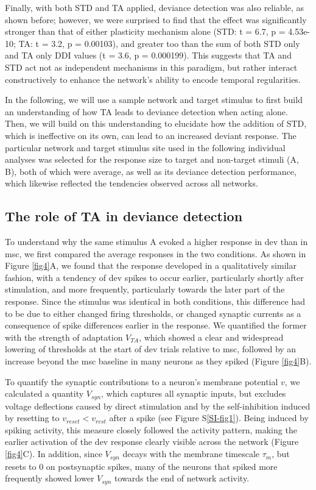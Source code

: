 \documentclass[pdflatex,iicol,sn-basic]{sn-jnl}
\theoremstyle{thmstyleone}%
\theoremstyle{thmstyletwo}%
\theoremstyle{thmstylethree}%
\begin{document}
Finally, with both STD and TA applied, deviance detection was also reliable, as shown before; however, we were surprised to find that the effect was significantly stronger than that of either plasticity mechanism alone (STD: t = 6.7, p = 4.53e-10; TA: t = 3.2, p = 0.00103), and greater too than the sum of both STD only and TA only DDI values (t = 3.6, p = 0.000199). This suggests that TA and STD act not as independent mechanisms in this paradigm, but rather interact constructively to enhance the network's ability to encode temporal regularities.

In the following, we will use a sample network and target stimulus to first build an understanding of how TA leads to deviance detection when acting alone. Then, we will build on this understanding to elucidate how the addition of STD, which is ineffective on its own, can lead to an increased deviant response. The particular network and target stimulus site used in the following individual analyses was selected for the response size to target and non-target stimuli (A, B), both of which were average, as well as its deviance detection performance, which likewise reflected the tendencies observed across all networks.

\subsection{The role of TA in deviance detection}\label{sec-ta}

To understand why the same stimulus A evoked a higher response in dev than in msc, we first compared the average responses in the two conditions. As shown in Figure \ref{fig4}A, we found that the response developed in a qualitatively similar fashion, with a tendency of dev spikes to occur earlier, particularly shortly after stimulation, and more frequently, particularly towards the later part of the response. Since the stimulus was identical in both conditions, this difference had to be due to either changed firing thresholds, or changed synaptic currents as a consequence of spike differences earlier in the response. We quantified the former with the strength of adaptation $V_{TA}$, which showed a clear and widespread lowering of thresholds at the start of dev trials relative to msc, followed by an increase beyond the msc baseline in many neurons as they spiked (Figure \ref{fig4}B).

To quantify the synaptic contributions to a neuron's membrane potential $v$, we calculated a quantity $V_{syn}$, which captures all synaptic inputs, but excludes voltage deflections caused by direct stimulation and by the self-inhibition induced by resetting to $v_{reset} < v_{rest}$ after a spike (see Figure S\ref{SI-fig1}). Being induced by spiking activity, this measure closely followed the activity pattern, making the earlier activation of the dev response clearly visible across the network (Figure \ref{fig4}C). In addition, since $V_{syn}$ decays with the membrane timescale $\tau_m$, but resets to $0$ on postsynaptic spikes, many of the neurons that spiked more frequently showed lower $V_{syn}$ towards the end of network activity.
\end{document}
